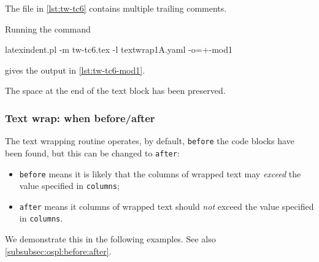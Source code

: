  \begin{example}
 The file in \cref{lst:tw-tc6} contains multiple trailing comments.

 Running the command

 \begin{commandshell}
latexindent.pl -m tw-tc6.tex -l textwrap1A.yaml -o=+-mod1 
\end{commandshell}

 gives the output in \cref{lst:tw-tc6-mod1}.
 \begin{cmhtcbraster}[raster column skip=.1\linewidth]
 \end{cmhtcbraster}
 The space at the end of the text block has been preserved.
 \end{example}

\subsubsection{Text wrap: when before/after}\label{subsubsec:tw:before:after}
 The text wrapping routine operates, by default, \texttt{before} the
  code blocks have been found, but
 this can be changed to \texttt{after}:
 \begin{itemize}
  \item \texttt{before} means it is likely that the columns of wrapped text may \emph{exceed} the
        value specified in \texttt{columns};
  \item \texttt{after} means it columns of wrapped text should \emph{not} exceed the value
        specified in \texttt{columns}.
 \end{itemize}
 We demonstrate this in the following examples. See also
 \cref{subsubsec:ospl:before:after}.

